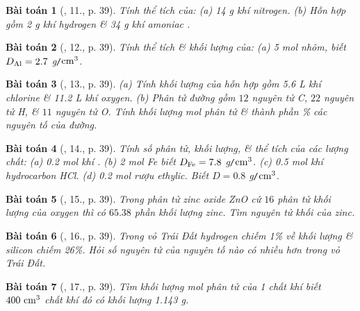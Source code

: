 \documentclass{article}
\newtheorem{baitoan}{Bài toán}
\begin{document}
\begin{baitoan}[\cite{An_Hoa_Hoc_nang_cao_8_9}, 11., p. 39]
	Tính thể tích của: (a) {\rm14 g} khí nitrogen. (b) Hỗn hợp gồm {\rm2 g} khí hydrogen \& {\rm34 g} khí amoniac {\rm{}}.
\end{baitoan}

\begin{baitoan}[\cite{An_Hoa_Hoc_nang_cao_8_9}, 12., p. 39]
	Tính thể tích \& khối lượng của: (a) {\rm5 mol} nhôm, biết $D_{\rm Al} = 2.7$ {\rm g{\tt/}$\rm cm^3$}.
\end{baitoan}

\begin{baitoan}[\cite{An_Hoa_Hoc_nang_cao_8_9}, 13., p. 39]
	(a) Tính khối lượng của hỗn hợp gồm {\rm5.6 L} khí chlorine \& {\rm11.2 L} khí oxygen. (b) Phân tử đường gồm $12$ nguyên tử {\rm C}, $22$ nguyên tử {\rm H}, \& $11$ nguyên tử {\rm O}. Tính khối lượng mol phân tử \& thành phần {\rm\%} các nguyên tố của đường.
\end{baitoan}

\begin{baitoan}[\cite{An_Hoa_Hoc_nang_cao_8_9}, 14., p. 39]
	Tính số phân tử, khối lượng, \& thể tích của các lượng chất: (a) {\rm0.2 mol} khí {\rm{}}. (b) {\rm2 mol Fe} biết $D_{\rm Fe} = 7.8$ {\rm g{\tt/}$\rm cm^3$}. (c) {\rm0.5 mol} khí hydrocarbon {\rm HCl}. (d) {\rm0.2 mol} rượu ethylic. Biết $D = 0.8$ {\rm g{\tt/}$\rm cm^3$}.
\end{baitoan}

\begin{baitoan}[\cite{An_Hoa_Hoc_nang_cao_8_9}, 15., p. 39]
	Trong phân tử zinc oxide {\rm ZnO} cứ $16$ phân tử khối lượng của oxygen thì có $65.38$ phần khối lượng zinc. Tìm nguyên tử khối của zinc.
\end{baitoan}

\begin{baitoan}[\cite{An_Hoa_Hoc_nang_cao_8_9}, 16., p. 39]
	Trong vỏ Trái Đất hydrogen chiếm {\rm1\%} về khối lượng \& silicon chiếm {\rm26\%}. Hỏi số nguyên tử của nguyên tố nào có nhiều hơn trong vỏ Trái Đất.
\end{baitoan}

\begin{baitoan}[\cite{An_Hoa_Hoc_nang_cao_8_9}, 17., p. 39]
	Tìm khối lượng mol phân tử của 1 chất khí biết $\rm400\ cm^3$ chất khí đó có khối lượng {\rm1.143 g}.
\end{baitoan}

\end{document}
